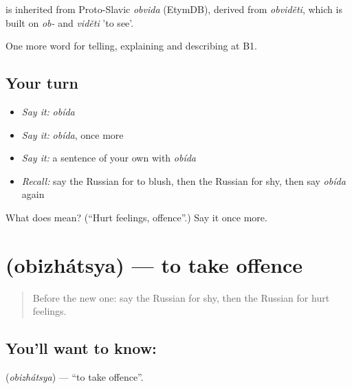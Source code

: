 \begin{cousinweb}
\emph{} is inherited from Proto-Slavic \emph{obvida} (EtymDB), derived from \emph{obviděti}, which is built on \emph{ob-} and \emph{viděti} 'to see'.
\end{cousinweb}

\begin{grammarlens}[title={What you've built}]
One more word for telling, explaining and describing at B1.
\end{grammarlens}

\subsection*{Your turn}
\begin{itemize}
\raggedright
  \item \emph{Say it:} \emph{obída}
  \item \emph{Say it:} \emph{obída}, once more
  \item \emph{Say it:} a sentence of your own with \emph{obída}
  \item \emph{Recall:} say the Russian for to blush, then the Russian for shy, then say \emph{obída} again
\end{itemize}

\begin{tcolorbox}[breakable,colback=teal!4,colframe=teal!35!black,title={Before you move on}]
What does  mean? (\textquotedblleft{}Hurt feelings, offence\textquotedblright{}.) Say it once more.
\end{tcolorbox}
\section[\texorpdfstring{\ru{обижаться} (obizhátsya)}{обижаться (obizhátsya)}]{ (obizhátsya) — to take offence}

\label{lesson:RU-C471-obizhatsya}



\begin{quote}
Before the new one: say the Russian for shy, then the Russian for hurt feelings.
\end{quote}

\subsection*{You'll want to know: }
\textbf{} (\emph{obizhátsya}) — \textquotedblleft{}to take offence\textquotedblright{}.

